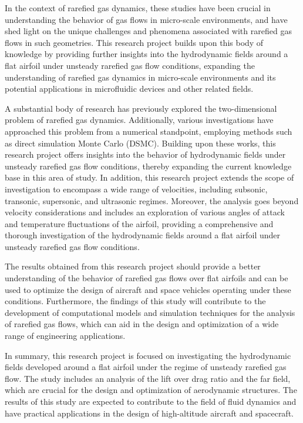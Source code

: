 In the context of rarefied gas dynamics, these studies have been crucial in understanding the behavior of gas flows in micro-scale environments, and have shed light on the unique challenges and phenomena associated with rarefied gas flows in such geometries. This research project builds upon this body of knowledge by providing further insights into the hydrodynamic fields around a flat airfoil under unsteady rarefied gas flow conditions, expanding the understanding of rarefied gas dynamics in micro-scale environments and its potential applications in microfluidic devices and other related fields.

A substantial body of research has previously explored the two-dimensional problem of rarefied gas dynamics\cite{manela2021propagation, aoki2001rarefied}. Additionally, various investigations have approached this problem from a numerical standpoint, employing methods such as direct simulation Monte Carlo (DSMC)\cite{shoja2014investigation, fan2001computation, aoki1997numerical}. Building upon these works, this research project offers insights into the behavior of hydrodynamic fields under unsteady rarefied gas flow conditions, thereby expanding the current knowledge base in this area of study. In addition, this research project extends the scope of investigation to encompass a wide range of velocities, including subsonic, transonic, supersonic, and ultrasonic regimes. Moreover, the analysis goes beyond velocity considerations and includes an exploration of various angles of attack and temperature fluctuations of the airfoil, providing a comprehensive and thorough investigation of the hydrodynamic fields around a flat airfoil under unsteady rarefied gas flow conditions.

The results obtained from this research project should provide a better understanding of the behavior of rarefied gas flows over flat airfoils and can be used to optimize the design of aircraft and space vehicles operating under these conditions. Furthermore, the findings of this study will contribute to the development of computational models and simulation techniques for the analysis of rarefied gas flows, which can aid in the design and optimization of a wide range of engineering applications.

In summary, this research project is focused on investigating the hydrodynamic fields developed around a flat airfoil under the regime of unsteady rarefied gas flow. The study includes an analysis of the lift over drag ratio and the far field, which are crucial for the design and optimization of aerodynamic structures. The results of this study are expected to contribute to the field of fluid dynamics and have practical applications in the design of high-altitude aircraft and spacecraft.